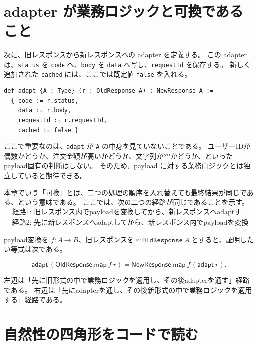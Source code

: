 \section{adapter が業務ロジックと可換であること}

次に、旧レスポンスから新レスポンスへの adapter を定義する。
この adapter は、\texttt{status} を \texttt{code} へ、\texttt{body} を \texttt{data} へ写し、\texttt{requestId} を保存する。
新しく追加された \texttt{cached} には、ここでは既定値 \texttt{false} を入れる。

\begin{listing}[htbp]
\begin{verbatim}
def adapt {A : Type} (r : OldResponse A) : NewResponse A :=
  { code := r.status,
    data := r.body,
    requestId := r.requestId,
    cached := false }
\end{verbatim}
\caption{旧レスポンスから新レスポンスへのadapter}
\label{lst:ch25-adapter}
\end{listing}

ここで重要なのは、\texttt{adapt} が \texttt{A} の中身を見ていないことである。
ユーザーIDが偶数かどうか、注文金額が高いかどうか、文字列が空かどうか、といったpayload固有の判断はしない。
そのため、payload に対する業務ロジックとは独立していると期待できる。

\begin{definitionbox}
本章でいう「可換」とは、二つの処理の順序を入れ替えても最終結果が同じである、という意味である。
ここでは、次の二つの経路が同じであることを示す。
\begin{align*}
&\text{経路1: 旧レスポンス内でpayloadを変換してから、新レスポンスへadaptする。}\\
&\text{経路2: 先に新レスポンスへadaptしてから、新レスポンス内でpayloadを変換する。}
\end{align*}
\end{definitionbox}

payload変換を \(f : A \to B\)、旧レスポンスを \(r : \texttt{OldResponse}\ A\) とすると、証明したい等式は次である。

\[
\mathsf{adapt}\,(\mathsf{OldResponse.map}\ f\ r)
=
\mathsf{NewResponse.map}\ f\,(\mathsf{adapt}\ r).
\]

左辺は「先に旧形式の中で業務ロジックを適用し、その後adapterを通す」経路である。
右辺は「先にadapterを通し、その後新形式の中で業務ロジックを適用する」経路である。

\section{自然性の四角形をコードで読む}

